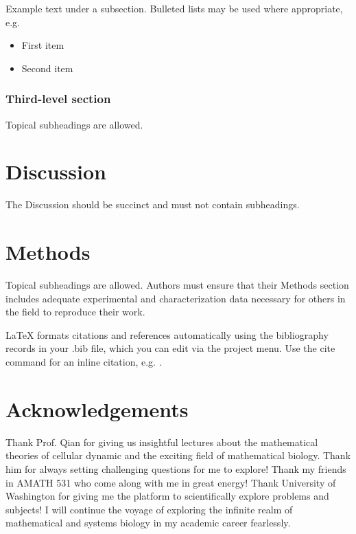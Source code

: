 \documentclass[fleqn,10pt]{wlscirep}
\begin{document}
Example text under a subsection. Bulleted lists may be used where appropriate, e.g.

\begin{itemize}
\item First item
\item Second item
\end{itemize}

\subsubsection*{Third-level section}
 
Topical subheadings are allowed.

\section*{Discussion}

The Discussion should be succinct and must not contain subheadings.

\section*{Methods}

Topical subheadings are allowed. Authors must ensure that their Methods section includes adequate experimental and characterization data necessary for others in the field to reproduce their work.



\noindent LaTeX formats citations and references automatically using the bibliography records in your .bib file, which you can edit via the project menu. Use the cite command for an inline citation, e.g.  \cite{Figueredo:2009dg}.

\section*{Acknowledgements}

Thank Prof. Qian for giving us insightful lectures about the mathematical theories of cellular dynamic and the exciting field of mathematical biology. Thank him for always setting challenging questions for me to explore! Thank my friends in AMATH 531 who come along with me in great energy! Thank University of Washington for giving me the platform to scientifically explore problems and subjects! I will continue the voyage of exploring the infinite realm of mathematical and systems biology in my academic career fearlessly.
\end{document}
